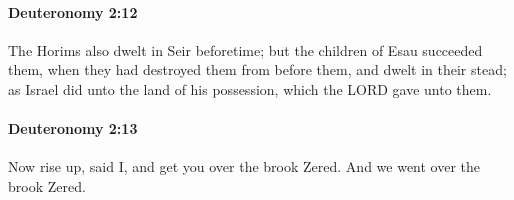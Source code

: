 		\paragraph{Deuteronomy 2:12} %
			\label{DEUTERONOMY-2-12}

			The Horims also dwelt in Seir beforetime; but the children of Esau succeeded them, when they had destroyed them from before them, and dwelt in their stead; as Israel did unto the land of his possession, which the LORD gave unto them.


		\paragraph{Deuteronomy 2:13} %
			\label{DEUTERONOMY-2-13}

			Now rise up, said I, and get you over the brook Zered. And we went over the brook Zered.


